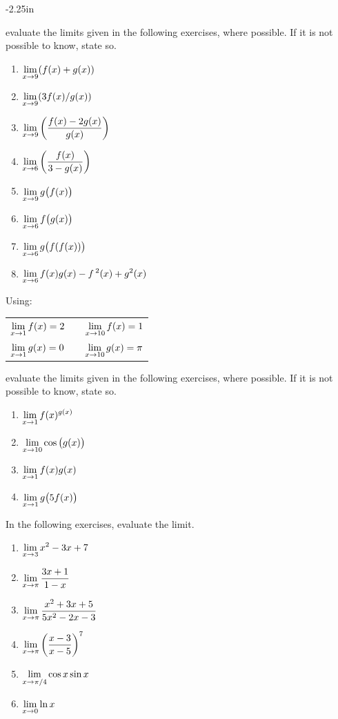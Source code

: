 \begin{adjustwidth*}{}{-2.25in}
\begin{multicols*}{2}
\noindent evaluate the limits given in the following exercises, where possible. If it is not possible to know, state so.
\begin{enumerate}[1),resume]
\item $\displaystyle \lim_{x\to9}(f(x)+g(x))$
\item $\displaystyle \lim_{x\to9}(3f(x)/g(x))$
\item $\displaystyle \lim_{x\to9}\left(\frac{f(x)-2g(x)}{g(x)}\right)$
\item $\displaystyle \lim_{x\to6}\left(\frac{f(x)}{3-g(x)}\right)$
\item $\displaystyle \lim_{x\to9}g\big(f(x)\big)$
\item $\displaystyle \lim_{x\to6}f\big(g(x)\big)$
\item $\displaystyle \lim_{x\to6}g\big(f(f(x))\big)$
\item $\displaystyle \lim_{x\to6}f(x)g(x)-f\,^2(x)+g^2(x)$
\end{enumerate}

\vspace{.5cm}

\noindent Using:

\begin{tabular}{lll}
$\displaystyle \lim_{x\to1}f(x) = 2$ & \quad\quad &$\displaystyle \lim_{x\to10} f(x) = 1$\\
$\displaystyle \lim_{x\to1}g(x) = 0$ &  & $\displaystyle \lim_{x\to10} g(x) = \pi$
\end{tabular}

\noindent evaluate the limits given in the following exercises, where possible. If it is not possible to know, state so.
\begin{multicols}{2}
\begin{enumerate}[1),resume]
\item $\displaystyle \lim_{x\to1}f(x)^{g(x)}$
\item $\displaystyle \lim_{x\to10}\cos \big(g(x)\big)$
\item $\displaystyle \lim_{x\to1}f(x)g(x)$
\item {$\displaystyle \lim_{x\to1}g\big(5f(x)\big)$}
\end{enumerate}
\end{multicols}

\vspace{.5cm}

\noindent In the following exercises, evaluate the limit.
\begin{multicols}{2}
\begin{enumerate}[1),start=23]
\item {$\displaystyle \lim_{x\to3}x^2-3x+7$}
\item {$\displaystyle \lim_{x\to\pi}\frac{3x+1}{1-x}$}
\item {$\displaystyle \lim_{x\to\pi}\frac{x^2+3x+5}{5x^2-2x-3}$}
\item {$\displaystyle \lim_{x\to\pi}\left(\frac{x-3}{x-5}\right)^7$}
\item {$\displaystyle \lim_{x\to\pi/4}\cos x\sin x$}
\item {$\displaystyle \lim_{x\to0}\ln x$}
\end{enumerate}
\end{multicols}


\end{multicols*}
\end{adjustwidth*}
